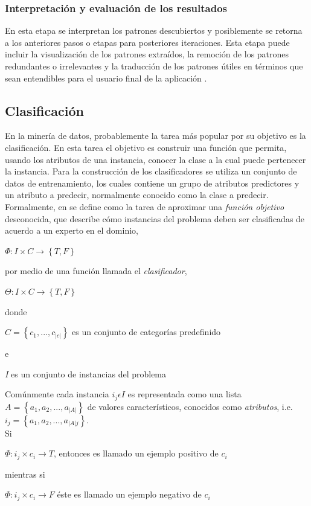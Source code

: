 \subsubsection{Interpretación y evaluación de los resultados \cite{key-50,key-100}}
En esta etapa se interpretan los patrones descubiertos y posiblemente se retorna a los anteriores pasos o etapas para posteriores iteraciones. Esta etapa puede incluir la visualización de los patrones extraídos, la remoción de los patrones redundantes o irrelevantes y la traducción de los patrones útiles en términos que sean entendibles para el usuario final de la aplicación \cite{key-100}.
\subsection{Clasificación}
En la minería de datos, probablemente la tarea más popular por su objetivo es la clasificación. En esta tarea el objetivo es construir una función que permita, usando los atributos de una instancia, conocer la clase a la cual puede pertenecer la instancia. Para la construcción de los clasificadores se utiliza un conjunto de datos de entrenamiento, los cuales contiene un grupo de atributos predictores y un atributo a predecir, normalmente conocido como la clase a predecir. \\
Formalmente, en \cite{key-70} se define como la tarea de aproximar una \emph{función objetivo} desconocida, que describe cómo instancias del problema deben ser clasificadas
de acuerdo a un experto en el dominio, \begin{center}$\Phi:I\times C\rightarrow\left\{ T,F\right\} $\end{center}
 por medio de una función llamada el \emph{clasificador}, \begin{center}
$\Theta:I\times C\rightarrow\left\{ T,F\right\} $
\end{center} 
 donde \begin{center}
 $C=\left\{ c_{1},...,c_{|c|}\right\} $ es un conjunto de categorías predefinido\end{center}
 e \begin{center}\emph{I} es un conjunto
de instancias del problema\end{center} Comúnmente cada instancia $i_{j}\epsilon I$
es representada como una lista $A=\left\{ a_{1},a_{2},...,a_{|A|}\right\} $
de valores característicos, conocidos como \emph{atributos}, i.e.
$i_{j}=\left\{ a_{1},a_{2},...,a_{|A|j}\right\} $. \\Si \begin{center}$\Phi:i_{j}\times c_{i}\rightarrow T$,
entonces es llamado un ejemplo positivo de $c_{i}$ \end{center} mientras si \begin{center}$\Phi:i_{j}\times c_{i}\rightarrow F$
éste es llamado un ejemplo negativo de $c_{i}$\end{center}

